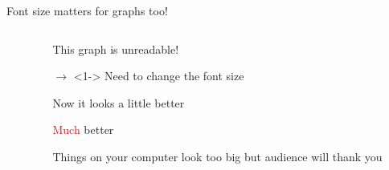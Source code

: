 \documentclass[notes,11pt, aspectratio=169]{beamer}
\newenvironment{wideitemize}{\itemize\addtolength{\itemsep}{10pt}}{\enditemize}
\begin{document}
\begin{frame}[label=methodology]{Font size matters for graphs too!}
\begin{columns}[T]
\begin{column}{.58\textwidth}
{{{    }
  }
}
\end{column}%
\hfill%
\begin{column}{.4\textwidth}
  \begin{wideitemize}
  \item[]<1-> This graph is unreadable! 
  \item[$\rightarrow$]<1-> Need to change the font size
  \item[]<2-> Now it looks a little better
  \item[]<3-> \textcolor{red}{Much} better 
  \item[]<3-> Things on your computer look too big but audience will thank you
  \end{wideitemize}
\end{column}%
\end{columns}
\end{frame}
\end{document}

